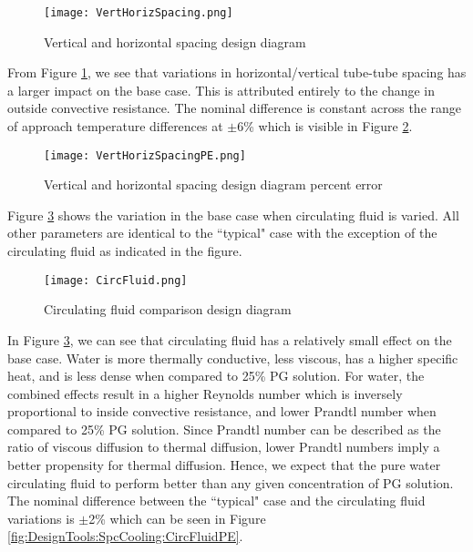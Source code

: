 	\begin{figure}
		\centering
		\texttt{[image: VertHorizSpacing.png]}
		\caption{Vertical and horizontal spacing design diagram}
		\label{fig:DesignTools:SpcCooling:VertHorizSpacing}
	\end{figure}
	
From Figure \ref{fig:DesignTools:SpcCooling:VertHorizSpacing}, we see that variations in horizontal/vertical tube-tube spacing has a larger impact on the base case. This is attributed entirely to the change in outside convective resistance. The nominal difference is constant across the range of approach temperature differences at $\pm$6\% which is visible in Figure \ref{fig:DesignTools:SpcCooling:VertHorizSpacingPE}.
	
	\begin{figure}
		\centering
		\texttt{[image: VertHorizSpacingPE.png]}
		\caption{Vertical and horizontal spacing design diagram percent error}
		\label{fig:DesignTools:SpcCooling:VertHorizSpacingPE}
	\end{figure}
	


Figure \ref{fig:DesignTools:SpcCooling:CircFluid} shows the variation in the base case when circulating fluid is varied. All other parameters are identical to the ``typical" case with the exception of the circulating fluid as indicated in the figure.

	\begin{figure}
		\centering
		\texttt{[image: CircFluid.png]}
		\caption{Circulating fluid comparison design diagram}
		\label{fig:DesignTools:SpcCooling:CircFluid}
	\end{figure}
	
In Figure \ref{fig:DesignTools:SpcCooling:CircFluid}, we can see that circulating fluid has a relatively small effect on the base case. Water is more thermally conductive, less viscous, has a higher specific heat, and is less dense when compared to 25\% PG solution. For water, the combined effects result in a higher Reynolds number which is inversely proportional to inside convective resistance, and lower Prandtl number when compared to 25\% PG solution. Since Prandtl number can be described as the ratio of viscous diffusion to thermal diffusion, lower Prandtl numbers imply a better propensity for thermal diffusion. Hence, we expect that the pure water circulating fluid to perform better than any given concentration of PG solution. The nominal difference between the ``typical" case and the circulating fluid variations is $\pm$2\% which can be seen in Figure \ref{fig:DesignTools:SpcCooling:CircFluidPE}.	
	
